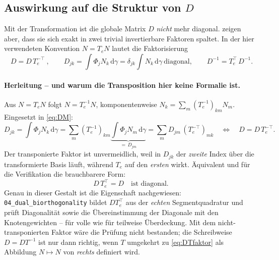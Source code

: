 \documentclass[a4paper,11pt]{article}
\def\bm#1{#1}%
\def\tilde#1{#1}%
\newcommand{\file}[1]{\texttt{\small #1}}
\begin{document}
\subsection{Auswirkung auf die Struktur von $\bm D$}
\label{sec:Dstruktur}
Mit der Transformation ist die globale Matrix $\bm D$ \emph{nicht} mehr diagonal.
\citet[Gl.~(4.12)]{popp2012} zeigen aber, dass sie sich exakt in zwei trivial invertierbare
Faktoren spaltet. In der hier verwendeten Konvention $\tilde{\bm N}=\bm T_e\bm N$ lautet die
Faktorisierung
\begin{equation}
\boxed{\ \bm D = \tilde{\bm D}\,\bm T_e^{-\top}\ },
\qquad \tilde D_{jk} = \int \Phi_j \tilde N_k\,\mathrm d\gamma = \delta_{jk}\!\int\tilde N_k\,\mathrm d\gamma
\ \text{diagonal},
\qquad \bm D^{-1} = \bm T_e^{\top}\,\tilde{\bm D}^{-1}.
\label{eq:DTfaktor}
\end{equation}

\paragraph{Herleitung -- und warum die Transposition hier keine Formalie ist.}
Aus $\tilde{\bm N}=\bm T_e\bm N$ folgt $\bm N=\bm T_e^{-1}\tilde{\bm N}$, komponentenweise
$N_k=\sum_m (\bm T_e^{-1})_{km}\tilde N_m$. Eingesetzt in \eqref{eq:DM}:
\begin{equation}
D_{jk} = \int \Phi_j N_k\,\mathrm d\gamma
= \sum_m (\bm T_e^{-1})_{km}\underbrace{\int \Phi_j \tilde N_m\,\mathrm d\gamma}_{=\,\tilde D_{jm}}
= \sum_m \tilde D_{jm}\,(\bm T_e^{-\top})_{mk}
\quad\Longleftrightarrow\quad
\bm D = \tilde{\bm D}\,\bm T_e^{-\top} .
\end{equation}
Der transponierte Faktor ist unvermeidlich, weil in $D_{jk}$ der \emph{zweite} Index über die
transformierte Basis läuft, während $\bm T_e$ auf den \emph{ersten} wirkt. Äquivalent und für die
Verifikation die brauchbarere Form:
\begin{equation}
\bm D\,\bm T_e^{\top} = \tilde{\bm D} \quad\text{ist diagonal}.
\label{eq:DTdiag}
\end{equation}
Genau in dieser Gestalt ist die Eigenschaft nachgewiesen: \file{04\_dual\_biorthogonality} bildet
$\bm D\bm T_e^{\!\top}$ aus der \emph{echten} Segmentquadratur und prüft Diagonalität sowie die
Übereinstimmung der Diagonale mit den Knotengewichten -- für volle wie für teilweise Überdeckung.
Mit dem nicht-transponierten Faktor wäre die Prüfung nicht bestanden; die Schreibweise
$\bm D=\tilde{\bm D}\bm T^{-1}$ ist nur dann richtig, wenn $\bm T$ umgekehrt zu \eqref{eq:DTfaktor}
als Abbildung $\bm N\mapsto\tilde{\bm N}$ von \emph{rechts} definiert wird.
\end{document}
